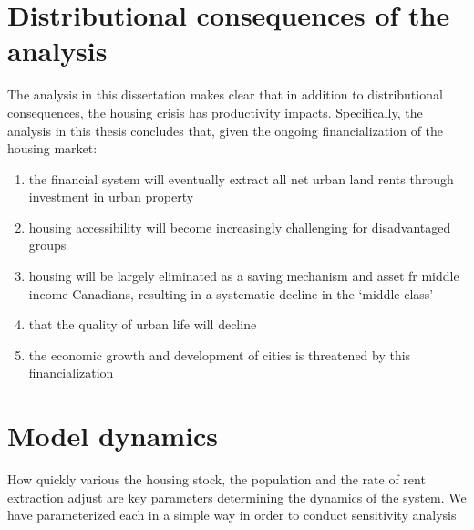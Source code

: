 \section{Distributional consequences of the analysis}
The analysis in this dissertation makes clear that in addition to distributional consequences, the housing crisis has productivity impacts. Specifically, the analysis in this thesis concludes that, given the ongoing financialization of the housing market:

\begin{enumerate}
\item the financial system will eventually extract all net urban land rents through investment in urban property
\item housing accessibility will become increasingly challenging for disadvantaged groups
\item housing will be largely eliminated as a saving mechanism and asset fr middle income Canadians,  resulting in a systematic decline in the `middle class'
\item that the quality of urban life will decline
\item the economic growth and development of cities is threatened by this financialization
\end{enumerate}


\section{Model dynamics}
How quickly various the housing stock, the population and the rate of rent extraction adjust are key parameters determining the dynamics of the system. We have parameterized each in a simple way in order to conduct sensitivity analysis